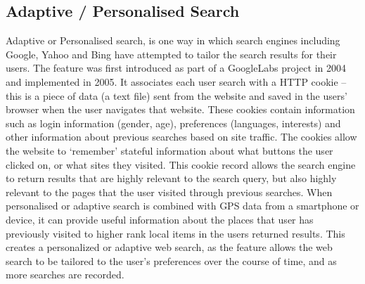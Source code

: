 \documentclass[11pt]{article}
\begin{document}
\subsection{Adaptive / Personalised Search}
Adaptive or Personalised search, is one way in which search engines including Google, Yahoo and Bing have attempted to tailor the search results for their users. The feature was first introduced as part of a GoogleLabs project in 2004 and implemented in 2005. It associates each user search with a HTTP cookie – this is a piece of data (a text file) sent from the website and saved in the users’ browser when the user navigates that website. These cookies contain information such as login information (gender, age), preferences (languages, interests) and other information about previous searches based on site traffic. The cookies allow the website to ‘remember’ stateful information about what buttons the user clicked on, or what sites they visited. This cookie record allows the search engine to return results that are highly relevant to the search query, but also highly relevant to the pages that the user visited through previous searches. When personalised or adaptive search is combined with GPS data from a smartphone or device, it can provide useful information about the places that user has previously visited to higher rank local items in the users returned results. This creates a personalized or adaptive web search, as the feature allows the web search to be tailored to the user’s preferences over the course of time, and as more searches are recorded.
\end{document}
